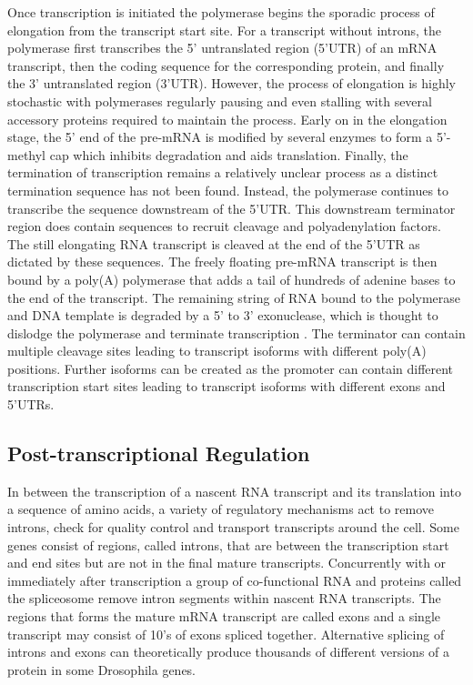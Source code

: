\documentclass[../main.tex]{subfiles}
\begin{document}
Once transcription is initiated the polymerase begins the sporadic process of elongation from the transcript start site.
For a transcript without introns, the polymerase first transcribes the 5' untranslated region (5'UTR) of an mRNA transcript, then the coding sequence for the corresponding protein, and finally the 3' untranslated region (3'UTR).
However, the process of elongation is highly stochastic with polymerases regularly pausing and even stalling with several accessory proteins required to maintain the process.
Early on in the elongation stage, the 5' end of the pre-mRNA is modified by several enzymes to form a 5'-methyl cap which inhibits degradation and aids translation.
Finally, the termination of transcription remains a relatively unclear process as a distinct termination sequence has not been found.
Instead, the polymerase continues to transcribe the sequence downstream of the 5'UTR.
This downstream terminator region does contain sequences to recruit cleavage and polyadenylation factors.
The still elongating RNA transcript is cleaved at the end of the 5'UTR as dictated by these sequences.
The freely floating pre-mRNA transcript is then bound by a poly(A) polymerase that adds a tail of hundreds of adenine bases to the end of the transcript.
The remaining string of RNA bound to the polymerase and DNA template is degraded by a 5' to 3' exonuclease, which is thought to dislodge the polymerase and terminate transcription \parencite{Alberts2017}.
The terminator can contain multiple cleavage sites leading to transcript isoforms with different poly(A) positions.
Further isoforms can be created as the promoter can contain different transcription start sites leading to transcript isoforms with different exons and 5'UTRs.

\subsection{Post-transcriptional Regulation}

In between the transcription of a nascent RNA transcript and its translation into a sequence of amino acids, a variety of regulatory mechanisms act to remove introns, check for quality control and transport transcripts around the cell.
Some genes consist of regions, called introns, that are between the transcription start and end sites but are not in the final mature transcripts.
Concurrently with or immediately after transcription a group of co-functional RNA and proteins called the spliceosome remove intron segments within nascent RNA transcripts.
The regions that forms the mature mRNA transcript are called exons and a single transcript may consist of 10's of exons spliced together.
Alternative splicing of introns and exons can theoretically produce thousands of different versions of a protein in some Drosophila genes.
\end{document}
